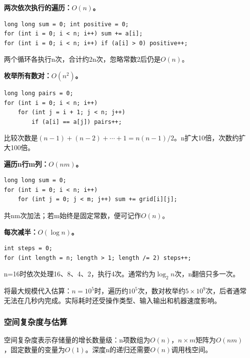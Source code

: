 \documentclass[UTF8,11pt,a4paper,fontset=none]{ctexart}
\begin{document}
\textbf{两次依次执行的遍历：$O(n)$。}
\par\noindent\begin{minipage}{\linewidth}
\begin{lstlisting}
long long sum = 0; int positive = 0;
for (int i = 0; i < n; i++) sum += a[i];
for (int i = 0; i < n; i++) if (a[i] > 0) positive++;
\end{lstlisting}
\end{minipage}\par
两个循环各执行n次，合计约2n次，忽略常数2后仍是$O(n)$。

\textbf{枚举所有数对：$O(n^2)$。}
\par\noindent\begin{minipage}{\linewidth}
\begin{lstlisting}
long long pairs = 0;
for (int i = 0; i < n; i++)
    for (int j = i + 1; j < n; j++)
        if (a[i] == a[j]) pairs++;
\end{lstlisting}
\end{minipage}\par
比较次数是$(n-1)+(n-2)+\cdots+1=n(n-1)/2$。n扩大10倍，次数约扩大100倍。

\textbf{遍历n行m列：$O(nm)$。}
\par\noindent\begin{minipage}{\linewidth}
\begin{lstlisting}
long long sum = 0;
for (int i = 0; i < n; i++)
    for (int j = 0; j < m; j++) sum += grid[i][j];
\end{lstlisting}
\end{minipage}\par
共nm次加法；若m始终是固定常数，便可记作$O(n)$。

\textbf{每次减半：$O(\log n)$。}
\par\noindent\begin{minipage}{\linewidth}
\begin{lstlisting}
int steps = 0;
for (int length = n; length > 1; length /= 2) steps++;
\end{lstlisting}
\end{minipage}\par
n=16时依次处理16、8、4、2，执行4次。通常约为$\log_2 n$次，n翻倍只多一次。

将最大规模代入估算：$n=10^5$时，遍历约$10^5$次，数对枚举约$5\times10^9$次，后者通常无法在几秒内完成。实际耗时还受操作类型、输入输出和机器速度影响。
\subsubsection{空间复杂度与估算}
空间复杂度表示存储量的增长数量级：n项数组为$O(n)$，$n\times m$矩阵为$O(nm)$，固定数量的变量为$O(1)$。深度n的递归还需要$O(n)$调用栈空间。
\end{document}
